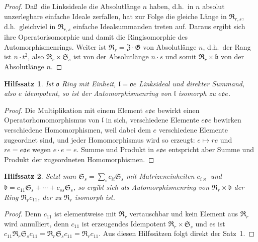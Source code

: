 \documentclass[12pt,a4paper]{article}
\theoremstyle{plain}
\newtheorem{hilfssatz}{Hilfssatz}[section]
\theoremstyle{definition}
\theoremstyle{remark}
\begin{document}
\begin{proof}
Da\ss\ die Linksideale die Absolutl\"ange $n$ haben, d.h.\ in $n$ absolut
unzerlegbare einfache Ideale zerfallen, hat zur Folge die gleiche
L\"ange in $\mathfrak{R}_{r,s}$, d.h.\ gleichviel in $\mathfrak{R}_{r,s}$ einfache
Idealsummanden treten auf. Daraus ergibt sich ihre Operatorisomorphie
und damit die Ringisomorphie des Automorphismenrings. Weiter ist
$\mathfrak{R}_{r} = \mathfrak{Z} \cdot \mathfrak{G}$ von Absolutl\"ange $n$, d.h.\ der Rang
ist $n \cdot t^{2}$, also $\mathfrak{R}_{r} \times \mathfrak{S}_{s}$ ist von der Absolutl\"ange
$n \cdot s$ und somit $\mathfrak{R}_{r} \times \mathfrak{b}$ von der Absolutl\"ange $n$.
\end{proof}

\begin{hilfssatz}\label{hilf:28-2}
Ist $\mathfrak{o}$ Ring mit Einheit, $\mathfrak{l} = \mathfrak{o}e$ Linksideal und direkter
Summand, also $e$ idempotent, so ist der Automorphismenring von
$\mathfrak{l}$ isomorph zu $e\mathfrak{o}e$.
\end{hilfssatz}

\begin{proof}
Die Multiplikation mit einem Element $e\mathfrak{o}e$ bewirkt einen
Operatorhomomorphismus von $\mathfrak{l}$ in sich, verschiedene Elemente
$e\mathfrak{o}e$ bewirken verschiedene Homomorphismen, weil dabei dem $e$
verschiedene Elemente zugeordnet sind, und jeder Homomorphismus
wird so erzeugt: $e \mapsto re$ und $re = e\mathfrak{o}e$ wegen $e \cdot e = e$.
Summe und Produkt in $e\mathfrak{o}e$ entspricht aber Summe und Produkt
der zugeordneten Homomorphismen.
\end{proof}

\begin{hilfssatz}\label{hilf:28-3}
Setzt man $\mathfrak{S}_{s} = \sum_{i} c_{ii}\mathfrak{S}_{s}$ mit Matrizeneinheiten
$c_{i\varkappa}$ und $\mathfrak{b} = c_{11}\mathfrak{S}_{s} + \cdots + c_{ss}\mathfrak{S}_{s}$,
so ergibt sich als Automorphismenring von $\mathfrak{R}_{r} \times \mathfrak{b}$ der
Ring $\mathfrak{R}_{r}c_{11}$, der zu $\mathfrak{R}_{r}$ isomorph ist.
\end{hilfssatz}

\begin{proof}
Denn $c_{11}$ ist elementweise mit $\mathfrak{R}_{r}$ vertauschbar und kein
Element aus $\mathfrak{R}_{r}$ wird annulliert, denn $c_{11}$ ist erzeugendes
Idempotent $\mathfrak{R}_{r} \times \mathfrak{S}_{s}$ und es ist
$c_{11}\mathfrak{R}_{r}\mathfrak{S}_{s}c_{11} = \mathfrak{R}_{r}\mathfrak{S}_{s}c_{11}
= \mathfrak{R}_{r}c_{11}$.
Aus diesen Hilfss\"atzen folgt direkt der Satz~1.
\end{proof}
\end{document}
